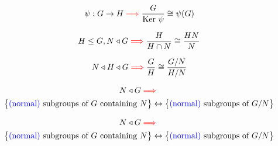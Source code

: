 
\begin{frame}
  \centerline{}
\end{frame}

\begin{frame}
  \begin{theorem}
	\[
	  \psi: G \to H \textcolor{red}{\implies} \frac{G}{\text{Ker } \psi} \cong \psi(G)
	\]
  \end{theorem}
  
  \begin{theorem}
	\[
	  H \le G, N \triangleleft G \textcolor{red}{\implies} \frac{H}{H \cap N} \cong \frac{HN}{N} 
	\]
  \end{theorem}

  \begin{theorem}
	\[
	  N \triangleleft H \triangleleft G \textcolor{red}{\implies} \frac{G}{H} \cong \frac{G/N}{H/N}
	\]
  \end{theorem}

  \begin{theorem}
	\vspace{-0.50cm}
	\begin{gather*}
	  N \triangleleft G \textcolor{red}{\implies} \\
	  \big\{\text{\textcolor{blue}{(normal)} subgroups of $G$ containing $N$}\big\} 
	  \leftrightarrow \big\{\text{\textcolor{blue}{(normal)} subgroups of $G/N$}\big\}
	\end{gather*}
  \end{theorem}
\end{frame}

\begin{frame}
  \begin{theorem}
	\vspace{-0.50cm}
	\begin{gather*}
	  N \triangleleft G \textcolor{red}{\implies} \\
	  \big\{\text{\textcolor{blue}{(normal)} subgroups of $G$ containing $N$}\big\} 
	  \leftrightarrow \big\{\text{\textcolor{blue}{(normal)} subgroups of $G/N$}\big\}
	\end{gather*}
  \end{theorem}

  \pause
\end{frame}

